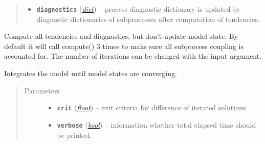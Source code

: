 \documentclass[a4paper,10pt,english]{sphinxmanual}
\begin{document}
\begin{fulllineitems}
\begin{fulllineitems}
\begin{quote}
\begin{description}
\begin{itemize}
\item {} 
\textbf{\texttt{diagnostics}} (\href{http://docs.python.org/2.7/library/stdtypes.html\#dict}{\emph{dict}}) -- process diagnostic dictionary is updated 
by diagnostic dictionaries of subprocesses 
after computation of tendencies.

\end{itemize}

\end{description}\end{quote}

\end{fulllineitems}


\begin{fulllineitems}
\label{api/climlab.process:climlab.process.time_dependent_process.TimeDependentProcess.compute_diagnostics}
Compute all tendencies and diagnostics, but don't update model state.
By default it will call compute() 3 times to make sure all
subprocess coupling is accounted for. The number of iterations can
be changed with the input argument.

\end{fulllineitems}


\begin{fulllineitems}
\label{api/climlab.process:climlab.process.time_dependent_process.TimeDependentProcess.integrate_converge}
Integrates the model until model states are converging.
\begin{quote}\begin{description}
\item[{Parameters}] \leavevmode\begin{itemize}
\item {} 
\textbf{\texttt{crit}} (\href{http://docs.python.org/2.7/library/functions.html\#float}{\emph{float}}) -- exit criteria for difference of iterated solutions

\item {} 
\textbf{\texttt{verbose}} (\href{http://docs.python.org/2.7/library/functions.html\#bool}{\emph{bool}}) -- information whether total elapsed time 
should be printed.


\end{itemize}
\end{description}
\end{quote}
\end{fulllineitems}
\end{fulllineitems}
\end{document}
